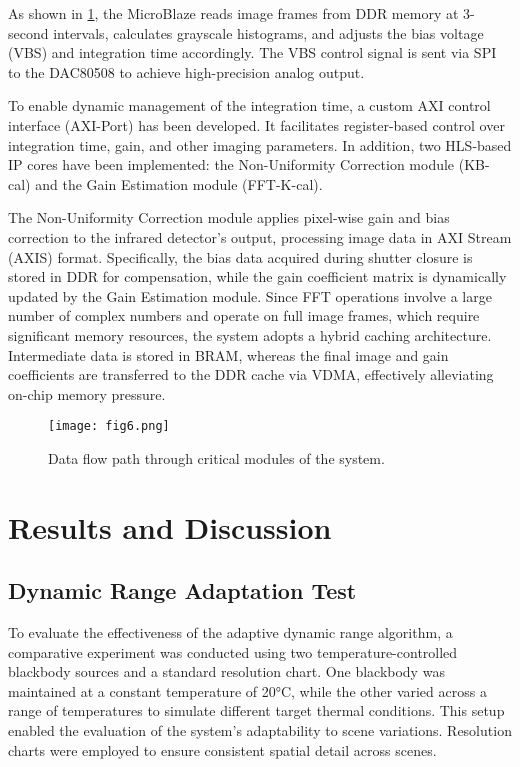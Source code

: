 \documentclass[a4paper,fleqn]{cas-dc}
\begin{document}
As shown in \cref{fig:fig6}, the MicroBlaze reads image frames from DDR memory at 3-second intervals, calculates grayscale histograms, and adjusts the bias voltage (VBS) and integration time accordingly. The VBS control signal is sent via SPI to the DAC80508 to achieve high-precision analog output.

To enable dynamic management of the integration time, a custom AXI control interface (AXI-Port) has been developed. It facilitates register-based control over integration time, gain, and other imaging parameters. In addition, two HLS-based IP cores have been implemented: the Non-Uniformity Correction module (KB-cal) and the Gain Estimation module (FFT-K-cal).

The Non-Uniformity Correction module applies pixel-wise gain and bias correction to the infrared detector’s output, processing image data in AXI Stream (AXIS) format. Specifically, the bias data acquired during shutter closure is stored in DDR for compensation, while the gain coefficient matrix is dynamically updated by the Gain Estimation module. Since FFT operations involve a large number of complex numbers and operate on full image frames, which require significant memory resources, the system adopts a hybrid caching architecture. Intermediate data is stored in BRAM, whereas the final image and gain coefficients are transferred to the DDR cache via VDMA, effectively alleviating on-chip memory pressure.

\begin{figure}[ht]
    \centering
    \texttt{[image: fig6.png]}
    \caption{Data flow path through critical modules of the system.}
    \label{fig:fig6}
\end{figure}




\section{Results and Discussion}
\subsection{Dynamic Range Adaptation Test}
\label{subsec2}

To evaluate the effectiveness of the adaptive dynamic range algorithm, a comparative experiment was conducted using two temperature-controlled blackbody sources and a standard resolution chart. One blackbody was maintained at a constant temperature of 20°C, while the other varied across a range of temperatures to simulate different target thermal conditions. This setup enabled the evaluation of the system’s adaptability to scene variations. Resolution charts were employed to ensure consistent spatial detail across scenes.
\end{document}
